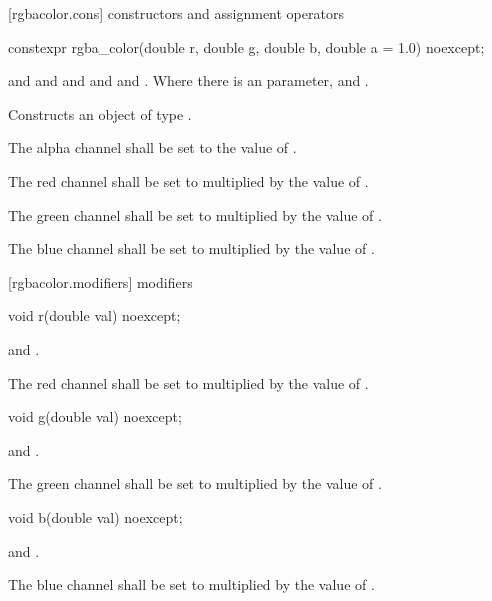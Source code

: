  [rgbacolor.cons] { constructors and assignment operators}

\begin{itemdecl}
constexpr rgba_color(double r, double g, double b, double a = 1.0) noexcept;
\end{itemdecl}
\begin{itemdescr}
\pnum
\requires
{} and  and  and  and  and . Where there is an  parameter,  and .

\pnum
\effects
Constructs an object of type .

\pnum
The alpha channel shall be set to the value of .

\pnum
The red channel shall be set to  multiplied by the value of  .

\pnum
The green channel shall be set to  multiplied by the value of .

\pnum
The blue channel shall be set to  multiplied by the value of .
\end{itemdescr}

 [rgbacolor.modifiers]{ modifiers}

\begin{itemdecl}
void r(double val) noexcept;
\end{itemdecl}

\begin{itemdescr}
\pnum
\requires
{} and .

\pnum
\effects
The red channel shall be set to  multiplied by the value of  .
\end{itemdescr}

\begin{itemdecl}
void g(double val) noexcept;
\end{itemdecl}
\begin{itemdescr}
\pnum
\requires
{} and .

\pnum
\effects
The green channel shall be set to  multiplied by the value of  .
\end{itemdescr}

\begin{itemdecl}
void b(double val) noexcept;
\end{itemdecl}
\begin{itemdescr}
\pnum
\requires
{} and .

\pnum
\effects
The blue channel shall be set to  multiplied by the value of  .
\end{itemdescr}

